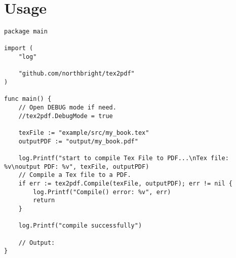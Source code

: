 \section{Usage}

\begin{verbatim}
package main

import (
	"log"

	"github.com/northbright/tex2pdf"
)

func main() {
	// Open DEBUG mode if need.
	//tex2pdf.DebugMode = true

	texFile := "example/src/my_book.tex"
	outputPDF := "output/my_book.pdf"

	log.Printf("start to compile Tex File to PDF...\nTex file: %v\noutput PDF: %v", texFile, outputPDF)
	// Compile a Tex file to a PDF.
	if err := tex2pdf.Compile(texFile, outputPDF); err != nil {
		log.Printf("Compile() error: %v", err)
		return
	}

	log.Printf("compile successfully")

	// Output:
}
\end{verbatim}
